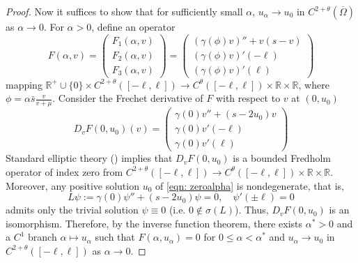 \documentclass{article}
\begin{document}
\begin{proof}
Now it suffices to show that for sufficiently small $\alpha$, $u_\alpha\to u_0$ in $C^{2+\theta}(\overline{\Omega})$ as $\alpha\to 0$. For $\alpha>0$, define an operator
\begin{equation*}
    F(\alpha,v) = \begin{pmatrix}
        F_1(\alpha,v)\\F_2(\alpha,v)\\F_3(\alpha,v)
    \end{pmatrix}=\begin{pmatrix}
        (\gamma(\phi)v)''+v(s-v)\\(\gamma(\phi)v)'(-\ell)\\(\gamma(\phi)v)'(\ell)
    \end{pmatrix} 
\end{equation*} mapping $\mathbb{R}^+\cup\{0\}\times C^{2+\theta}([-\ell,\ell])\to C^\theta([-\ell,\ell])\times \mathbb R\times \mathbb R$, where $\phi=\alpha\bar s \frac{v}{v+\mu}$. Consider the Frechet derivative of $F$ with respect to $v$ at $(0,u_0)$
\begin{equation*}
    D_vF(0,u_0)(v)=\begin{pmatrix}
        \gamma(0)v''+(s-2u_0)v\\ \gamma(0)v'(-\ell)\\ \gamma(0)v'(\ell)
    \end{pmatrix} 
\end{equation*} 
Standard elliptic theory (\cite{Cantrell1989,GilbargTrudinger,Lou2006}) implies that $D_vF(0,u_0)$ is a bounded Fredholm operator of index zero from $C^{2+\theta}([-\ell,\ell])\to C^\theta([-\ell,\ell])\times \mathbb R\times \mathbb R$. Moreover, any positive solution $u_0$ of \eqref{eqn: zeroalpha} is nondegenerate, that is, \begin{equation*}
   L\psi:= \gamma(0)\psi''+(s-2u_0)\psi=0, \quad \psi'(\pm\ell)=0
\end{equation*} admits only the trivial solution $\psi\equiv 0$ (i.e. $0\notin \sigma (L)$). Thus, $D_vF(0,u_0)$ is an isomorphism. Therefore, by the inverse function theorem, there exists $\alpha^*>0$ and a $C^1$ branch $\alpha\mapsto u_\alpha$ such that
$F(\alpha,u_\alpha)=0$ for $0\le \alpha<\alpha^*$ and $u_\alpha\to u_0$ in $C^{2+\theta}([-\ell,\ell])$ as $\alpha\to 0$.
\end{proof}
\end{document}
